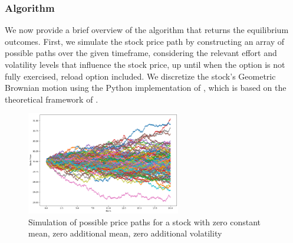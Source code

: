 \subsubsection*{Algorithm}
We now provide a brief overview of the algorithm that returns the equilibrium outcomes. First, we simulate the stock price path by constructing an array of possible paths over the given timeframe, considering the relevant effort and volatility levels that influence the stock price, up until when the option is not fully exercised, reload option included. We discretize the stock's Geometric Brownian motion using the Python implementation of \cite{qsbrownianpy}, which is based on the theoretical framework of \cite{glasserman2004monte}. 
\vspace*{15pt}
\begin{figure}[H]
    \centering
    \includegraphics[width=0.6\textwidth]{fig/5/sim_motion.png}
    \caption{Simulation of possible price paths for a stock with zero constant mean, zero additional mean, zero additional volatility}
    \label{fig:sim_motion}
\end{figure}
\vspace*{15pt}

